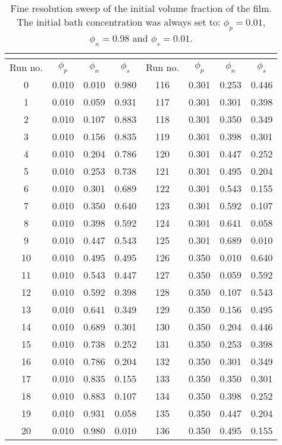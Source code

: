 \documentclass[journal=mamobx,manuscript=suppinfo]{achemso}
\begin{document}
\begin{longtable}{cccc|cccc}
\caption{Fine resolution sweep of the initial volume fraction of the film.
The initial bath concentration was always set to: $\phi_{p} = 0.01$, $\phi_{n} = 0.98$ and $\phi_{s} = 0.01$.
}\\
\label{tab:fine}\\
\hline
Run no. & $\phi_{p}$ & $\phi_{n}$ & $\phi_{s}$ & Run no. & $\phi_{p}$ & $\phi_{n}$ & $\phi_{s}$ \\
\hline
0 & 0.010 & 0.010 & 0.980  &  116 & 0.301 & 0.253 & 0.446 \\
1 & 0.010 & 0.059 & 0.931  &  117 & 0.301 & 0.301 & 0.398 \\
2 & 0.010 & 0.107 & 0.883  &  118 & 0.301 & 0.350 & 0.349 \\
3 & 0.010 & 0.156 & 0.835  &  119 & 0.301 & 0.398 & 0.301 \\
4 & 0.010 & 0.204 & 0.786  &  120 & 0.301 & 0.447 & 0.252 \\
5 & 0.010 & 0.253 & 0.738  &  121 & 0.301 & 0.495 & 0.204 \\
6 & 0.010 & 0.301 & 0.689  &  122 & 0.301 & 0.543 & 0.155 \\
7 & 0.010 & 0.350 & 0.640  &  123 & 0.301 & 0.592 & 0.107 \\
8 & 0.010 & 0.398 & 0.592  &  124 & 0.301 & 0.641 & 0.058 \\
9 & 0.010 & 0.447 & 0.543  &  125 & 0.301 & 0.689 & 0.010 \\
10 & 0.010 & 0.495 & 0.495  & 126 & 0.350 & 0.010 & 0.640 \\
11 & 0.010 & 0.543 & 0.447  & 127 & 0.350 & 0.059 & 0.592 \\
12 & 0.010 & 0.592 & 0.398  & 128 & 0.350 & 0.107 & 0.543 \\
13 & 0.010 & 0.641 & 0.349  & 129 & 0.350 & 0.156 & 0.495 \\
14 & 0.010 & 0.689 & 0.301  & 130 & 0.350 & 0.204 & 0.446 \\
15 & 0.010 & 0.738 & 0.252  & 131 & 0.350 & 0.253 & 0.398 \\
16 & 0.010 & 0.786 & 0.204  & 132 & 0.350 & 0.301 & 0.349 \\
17 & 0.010 & 0.835 & 0.155  & 133 & 0.350 & 0.350 & 0.301 \\
18 & 0.010 & 0.883 & 0.107  & 134 & 0.350 & 0.398 & 0.252 \\
19 & 0.010 & 0.931 & 0.058  & 135 & 0.350 & 0.447 & 0.204 \\
20 & 0.010 & 0.980 & 0.010  & 136 & 0.350 & 0.495 & 0.155 \\

\end{longtable}
\end{document}
